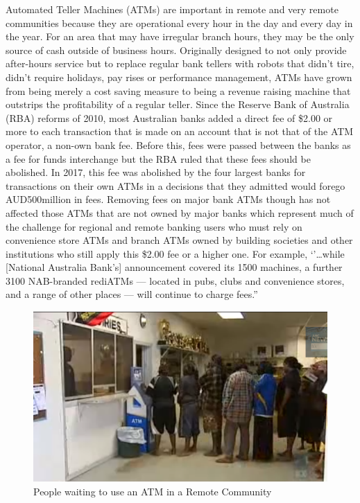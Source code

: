 Automated Teller Machines (ATMs) are important in remote and very remote communities because they are operational every hour in the day and every day in the year. For an area that may have irregular branch hours, they may be the only source of cash outside of business hours. Originally designed to not only provide after-hours service but to replace regular bank tellers with robots that didn't tire, didn't require holidays, pay rises or performance management, ATMs have grown from being merely a cost saving measure to being a revenue raising machine that outstrips the profitability of a regular teller. Since the Reserve Bank of Australia (RBA) reforms of 2010, most Australian banks added a direct fee of \$2.00 or more to each  transaction that is made on an account that is not that of the ATM operator, a non-own bank fee. Before this, fees were passed between the banks as a fee for funds interchange but the RBA ruled that these fees should be abolished.  In 2017, this fee was abolished by the four largest banks for transactions on their own ATMs\cite{RefWorks:458} in a decisions that they admitted would forego AUD500million in fees. Removing fees on major bank ATMs though has not affected those ATMs that are not owned by major banks which represent much of the challenge for regional and remote banking users who must rely on convenience store ATMs and branch ATMs owned by building societies and other institutions who still apply this \$2.00 fee or a higher one. For example, `'\ldots{}while [National Australia Bank's] announcement covered its 1500 machines, a further 3100 NAB-branded rediATMs --- located in pubs, clubs and convenience stores, and a range of other places --- will continue to charge fees.\cite{RefWorks:457}''

\begin{figure}[ht]
\centering
\includegraphics[scale=0.5]{figures/ATMLine.png} 
\caption{People waiting to use an ATM in a Remote Community\cite{RefWorks:378}}\label{fig:ATMLine}
\end{figure}

